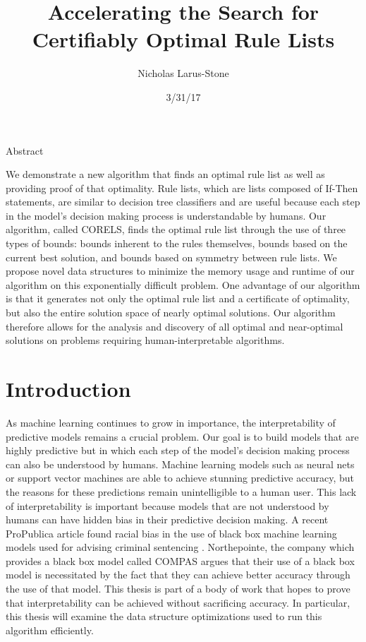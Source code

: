 \documentclass[]{article}
\theoremstyle{definition}
\begin{document}
\title{Accelerating the Search for Certifiably Optimal Rule Lists}
\author{Nicholas Larus-Stone}
\date{3/31/17}
\maketitle

\begin{center}
Abstract
\end{center}

We demonstrate a new algorithm that finds an optimal rule list as well as providing proof of that optimality. Rule lists, which are lists composed of If-Then statements, are similar to decision tree classifiers and are useful because each step in the model's decision making process is understandable by humans. Our algorithm, called CORELS, finds the optimal rule list through the use of three types of bounds: bounds inherent to the rules themselves, bounds based on the current best solution, and bounds based on symmetry between rule lists. We propose novel data structures to minimize the memory usage and runtime of our algorithm on this exponentially difficult problem. One advantage of our algorithm is that it generates not only the optimal rule list and a certificate of optimality, but also the entire solution space of nearly optimal solutions. Our algorithm therefore allows for the analysis and discovery of all optimal and near-optimal solutions on problems requiring human-interpretable algorithms.

\section{Introduction}

As machine learning continues to grow in importance, the interpretability of predictive models remains a crucial problem.
Our goal is to build models that are highly predictive but in which each step of the model's decision making process can also be understood by humans.
Machine learning models such as neural nets or support vector machines are able to achieve stunning predictive accuracy, but the reasons for these predictions remain unintelligible to a human user.
This lack of interpretability is important because models that are not understood by humans can have hidden bias in their predictive decision making.
A recent ProPublica article found racial bias in the use of black box machine learning models used for advising criminal sentencing \cite{LarsonMaKiAn16}.
Northepointe, the company which provides a black box model called COMPAS argues that their use of a black box model is necessitated by the fact that they can achieve better accuracy through the use of that model.
This thesis is part of a body of work that hopes to prove that interpretability can be achieved without sacrificing accuracy.
In particular, this thesis will examine the data structure optimizations used to run this algorithm efficiently.
\end{document}
